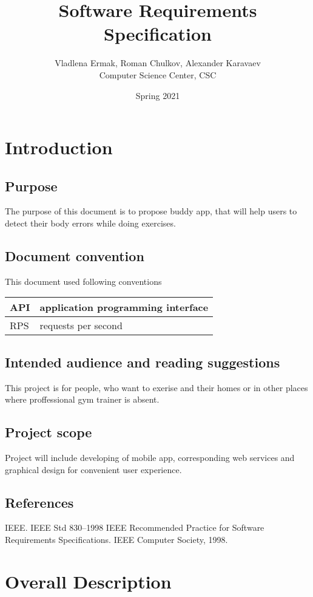 \documentclass{article}
\title{Software Requirements Specification}
\date{Spring 2021}
\author{Vladlena Ermak, Roman Chulkov, Alexander Karavaev \\ Computer Science Center, CSC}
\begin{document}
\maketitle
\clearpage

\section{Introduction}
\subsection{Purpose}
The purpose of this document is to propose buddy app, that will help users to detect their body errors while doing exercises.

\subsection{Document convention}
This document used following conventions
\begin{table}[h!]
	\begin{tabular}{|l|l|}
	\hline
	API & application programming interface  \\ \hline
	RPS & requests per second \\ \hline

	\end{tabular}
	\end{table}

\subsection{Intended audience and reading suggestions}
This project is for people, who want to exerise and their homes or in other places where proffessional gym trainer is absent.

\subsection{Project scope}
Project will include developing of mobile app, corresponding web services and graphical design for convenient user experience.

\subsection{References}
IEEE. IEEE Std 830–1998 IEEE Recommended Practice for Software Requirements Specifications. IEEE Computer Society, 1998.

\section{Overall Description}
\end{document}

